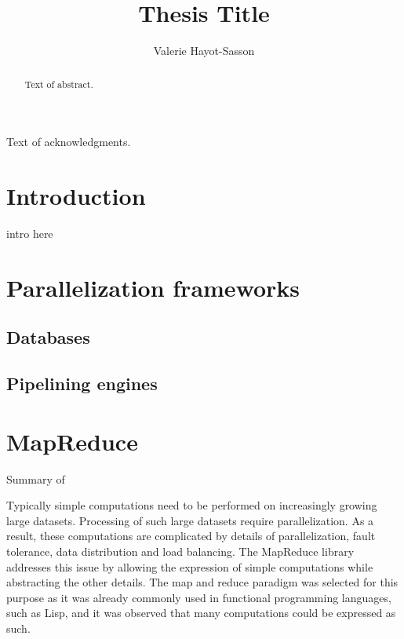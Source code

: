 \documentclass{report}
\author{Valerie Hayot-Sasson}
\title{Thesis Title}
\begin{document}
\begin{abstract}
  Text of abstract.  
\end{abstract}

\begin{acknowledgments}
  Text of acknowledgments.
\end{acknowledgments}

\chapter{Introduction}
intro here
\chapter{Parallelization frameworks}
\section{Databases}
\section{Pipelining engines}
\chapter{MapReduce}
Summary of ~\cite{mapred}

Typically simple computations need to be performed on increasingly growing large datasets. 
Processing of such large datasets require parallelization. As a result, these computations are 
complicated by details of parallelization, fault tolerance, data distribution and load balancing. The 
MapReduce library addresses this issue by allowing the expression of simple computations while 
abstracting the other details. The map and reduce paradigm was selected for this purpose as it 
was already commonly used in functional programming languages, such as Lisp, and it was 
observed that many computations could be expressed as such.
\end{document}
